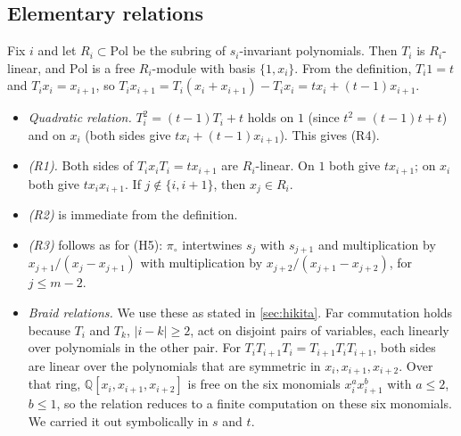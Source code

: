 \documentclass[11pt]{amsart}
\theoremstyle{definition}
\theoremstyle{remark}
\numberwithin{equation}{section}
\begin{document}
\subsection{Elementary relations}\label{app:elementary}
Fix $i$ and let $R_i\subset\mathrm{Pol}$ be the subring of $s_i$-invariant polynomials. Then $T_i$ is $R_i$-linear, and $\mathrm{Pol}$ is a free $R_i$-module with basis $\{1,x_i\}$. From the definition, $T_i1=t$ and $T_ix_i=x_{i+1}$, so $T_ix_{i+1}=T_i(x_i+x_{i+1})-T_ix_i=tx_i+(t-1)x_{i+1}$.
\begin{itemize}
\item \emph{Quadratic relation.} $T_i^2=(t-1)T_i+t$ holds on $1$ (since $t^2=(t-1)t+t$) and on $x_i$ (both sides give $tx_i+(t-1)x_{i+1}$). This gives (R4).
\item \emph{(R1).} Both sides of $T_ix_iT_i=tx_{i+1}$ are $R_i$-linear. On $1$ both give $tx_{i+1}$; on $x_i$ both give $tx_ix_{i+1}$. If $j\notin\{i,i+1\}$, then $x_j\in R_i$.
\item \emph{(R2)} is immediate from the definition.
\item \emph{(R3)} follows as for (H5): $\pi_\circ$ intertwines $s_j$ with $s_{j+1}$ and multiplication by $x_{j+1}/(x_j-x_{j+1})$ with multiplication by $x_{j+2}/(x_{j+1}-x_{j+2})$, for $j\le m-2$.
\item \emph{Braid relations.} We use these as stated in \cref{sec:hikita}. Far commutation holds because $T_i$ and $T_k$, $|i-k|\ge2$, act on disjoint pairs of variables, each linearly over polynomials in the other pair. For $T_iT_{i+1}T_i=T_{i+1}T_iT_{i+1}$, both sides are linear over the polynomials that are symmetric in $x_i,x_{i+1},x_{i+2}$. Over that ring, $\mathbb{Q}[x_i,x_{i+1},x_{i+2}]$ is free on the six monomials $x_i^ax_{i+1}^b$ with $a\le2$, $b\le1$, so the relation reduces to a finite computation on these six monomials. We carried it out symbolically in $s$ and $t$.
\end{itemize}
\end{document}
